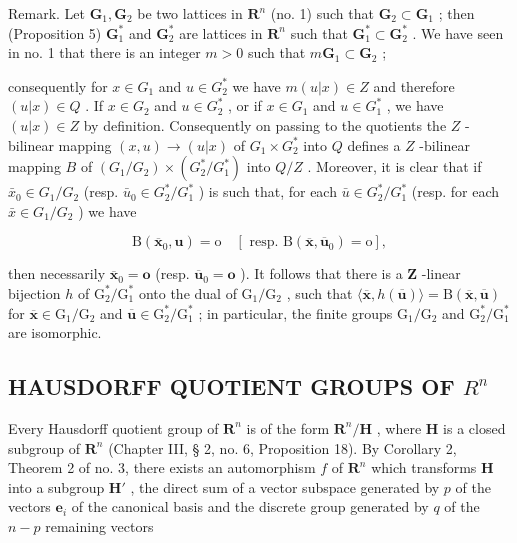 Remark. Let \(\mathbf{G}_1, \mathbf{G}_2\) be two lattices in \(\mathbf{R}^n\) (no. 1) such that \(\mathbf{G}_2 \subset \mathbf{G}_1\) ; then (Proposition 5) \(\mathbf{G}_1^*\) and \(\mathbf{G}_2^*\) are lattices in \(\mathbf{R}^n\) such that \(\mathbf{G}_1^* \subset \mathbf{G}_2^*\) . We have seen in no. 1 that there is an integer \(m > 0\) such that \(m\mathbf{G}_1 \subset \mathbf{G}_2\) ;

consequently for \(x \in G_1\) and \(u \in G_2^*\) we have \(m(u|x) \in Z\) and therefore \((u|x) \in Q\) . If \(x \in G_2\) and \(u \in G_2^*\) , or if \(x \in G_1\) and \(u \in G_1^*\) , we have \((u|x) \in Z\) by definition. Consequently on passing to the quotients the \(Z\) -bilinear mapping \((x, u) \to (u|x)\) of \(G_1 \times G_2^*\) into \(Q\) defines a \(Z\) -bilinear mapping \(B\) of \((G_1/G_2) \times (G_2^*/G_1^*)\) into \(Q/Z\) . Moreover, it is clear that if \(\bar{x}_0 \in G_1/G_2\) (resp. \(\bar{u}_0 \in G_2^*/G_1^*\) ) is such that, for each \(\bar{u} \in G_2^*/G_1^*\) (resp. for each \(\bar{x} \in G_1/G_2\) ) we have

\[
\mathrm{B} (\overline {{{\boldsymbol {x}}}} _ {0}, \boldsymbol {u}) = \mathrm{o} \quad [ \text { resp. } \mathrm{B} (\overline {{{\boldsymbol {x}}}}, \overline {{{\boldsymbol {u}}}} _ {0}) = \mathrm{o} ],
\]

then necessarily \(\overline{\mathbf{x}}_0 = \mathbf{o}\) (resp. \(\overline{\mathbf{u}}_0 = \mathbf{o}\) ). It follows that there is a \(\mathbf{Z}\) -linear bijection \(h\) of \(\mathrm{G}_2^* / \mathrm{G}_1^*\) onto the dual of \(\mathrm{G}_1 / \mathrm{G}_2\) , such that \(\langle \overline{\mathbf{x}}, h(\overline{\mathbf{u}}) \rangle = \mathrm{B}(\overline{\mathbf{x}}, \overline{\mathbf{u}})\) for \(\overline{\mathbf{x}} \in \mathrm{G}_1 / \mathrm{G}_2\) and \(\overline{\mathbf{u}} \in \mathrm{G}_2^* / \mathrm{G}_1^*\) ; in particular, the finite groups \(\mathrm{G}_1 / \mathrm{G}_2\) and \(\mathrm{G}_2^* / \mathrm{G}_1^*\) are isomorphic.

\subsection{\texorpdfstring{HAUSDORFF QUOTIENT GROUPS OF \(R^{n}\)}{HAUSDORFF QUOTIENT GROUPS OF R TO THE N}}

Every Hausdorff quotient group of \(\mathbf{R}^n\) is of the form \(\mathbf{R}^n/\mathbf{H}\) , where \(\mathbf{H}\) is a closed subgroup of \(\mathbf{R}^n\) (Chapter III, § 2, no. 6, Proposition 18). By Corollary 2, Theorem 2 of no. 3, there exists an automorphism \(f\) of \(\mathbf{R}^n\) which transforms \(\mathbf{H}\) into a subgroup \(\mathbf{H}'\) , the direct sum of a vector subspace generated by \(p\) of the vectors \(\boldsymbol{e}_i\) of the canonical basis and the discrete group generated by \(q\) of the \(n-p\) remaining vectors

